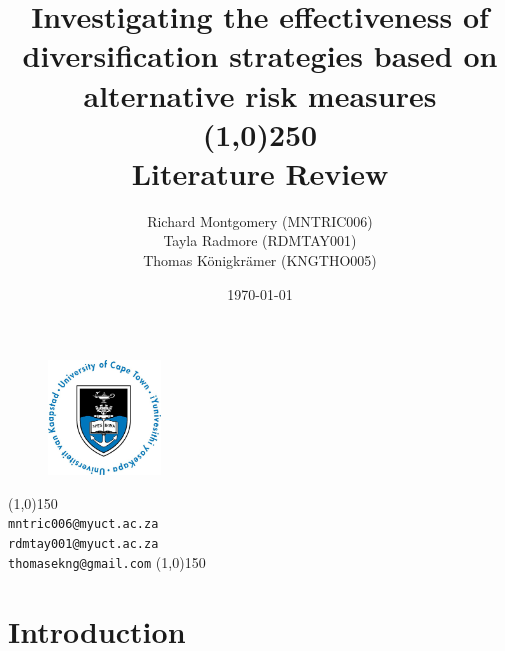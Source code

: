 \documentclass[12pt,a4paper]{article}
\begin{document}
\begin{titlepage}

\title{Investigating the effectiveness of diversification strategies based on alternative risk measures\\
\line(1,0){250}\\
\large Literature Review}

\date{\today}

\author{Richard Montgomery (MNTRIC006)\\
Tayla Radmore (RDMTAY001)\\
Thomas K{\"o}nigkr{\"a}mer (KNGTHO005)}

\maketitle

\begin{figure}

\begin{center}
\includegraphics[width=3cm]{UCTlogo.jpg}\\[1cm]
\end{center}

\end{figure}

\begin{center}
\line(1,0){150}\\
{\tt mntric006@myuct.ac.za}\\
{\tt rdmtay001@myuct.ac.za}\\
{\tt thomasekng@gmail.com}
\line(1,0){150}\\
\end{center}

\thispagestyle{empty}

\end{titlepage}


\tableofcontents

\newpage


\section{Introduction}
\label{sec:Intro}
\end{document}
